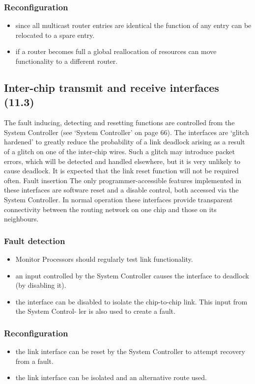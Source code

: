 \documentclass[11pt]{article}
\newenvironment{itmz}{
	\begin{itemize}
		\setlength{\itemsep}{0pt}
		\setlength{\parskip}{0pt}
	}{\end{itemize}}
\begin{document}
\subsubsection*{Reconfiguration}
\begin{itmz}
\item since all multicast router entries are identical the function of any entry can be relocated to a spare
entry.
\item if a router becomes full a global reallocation of resources can move functionality to a different
router.
\end{itmz}

\subsection{Inter-chip transmit and receive interfaces (11.3)}
The fault inducing, detecting and resetting functions are controlled from the System Controller (see
`System Controller' on page 66). The interfaces are `glitch hardened' to greatly reduce the
probability of a link deadlock arising as a result of a glitch on one of the inter-chip wires. Such a
glitch may introduce packet errors, which will be detected and handled elsewhere, but it is very
unlikely to cause deadlock. It is expected that the link reset function will not be required often.
Fault insertion
The only programmer-accessible features implemented in these interfaces are software reset and a
disable control, both accessed via the System Controller. In normal operation these interfaces
provide transparent connectivity between the routing network on one chip and those on its
neighbours.
\subsubsection*{Fault detection}
\begin{itmz}
\item Monitor Processors should regularly test link functionality.
\item an input controlled by the System Controller causes the interface to deadlock (by disabling it).
\item the interface can be disabled to isolate the chip-to-chip link. This input from the System Control-
ler is also used to create a fault.
\end{itmz}
\subsubsection*{Reconfiguration}
\begin{itmz}
\item the link interface can be reset by the System Controller to attempt recovery from a fault.
\item the link interface can be isolated and an alternative route used.
\end{itmz}
\end{document}
